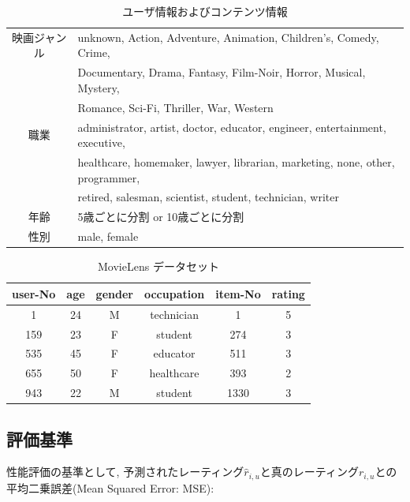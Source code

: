 \documentclass[a4paper]{jarticle}
\begin{document}
\begin{table}[H]
\begin{center}
\caption{ユーザ情報およびコンテンツ情報}   %
\label{MovieLens}   %
\begin{tabular}{c l}
\hline
映画ジャンル & unknown, Action, Adventure, Animation, Children's, Comedy, Crime, \\
                 & Documentary, Drama, Fantasy, Film-Noir, Horror, Musical, Mystery, \\
                 & Romance, Sci-Fi, Thriller, War, Western \\
職業          & administrator, artist, doctor, educator, engineer, entertainment, executive, \\
                & healthcare, homemaker, lawyer, librarian, marketing, none, other, programmer, \\
                & retired, salesman, scientist, student, technician, writer \\
年齢 & 5歳ごとに分割 or 10歳ごとに分割 \\
性別 & male, female\\ 
\hline
\end{tabular}
\end{center}
\end{table}

\begin{table}[H]
\begin{center}
\caption{MovieLens データセット}   %
\begin{tabular}{|c|c|c|c|c|c|}
\hline
user-No	&	age	&	gender	&	occupation	&	item-No	& rating \\ \hline \hline
1	&	24	&	M	&	technician	&  1  & 5 \\	\hline
159	&    23	&     F	&      student	      &  274 & 3 \\	\hline
535	&	45	&	F	&	educator	&	511	& 3 \\ \hline
655	&	50	&	F	&	healthcare	& 393 & 2 \\	\hline
943	&	22	&	M	&	student	&	1330 & 3 \\  \hline
\end{tabular}
\end{center}
\end{table}
\subsection{評価基準}

性能評価の基準として, 予測されたレーティング$\hat{r}_{i, u}$と真のレーティング$r_{i, u}$との平均二乗誤差(Mean Squared Error: MSE):
\end{document}
